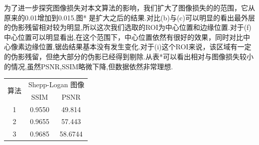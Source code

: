 \documentclass[hyperref]{ctexart}
\begin{document}
{		\begin{multicols}{2}
			为了进一步探究图像损失对本文算法的影响，我们扩大了图像损失的的范围，它从原来的0.01增加到0.015.图* 是扩大之后的结果.对比(b)与(c)可以明显的看出最外层的伪影残留相对较为明显,所以这次我们选取的ROI为中心位置和边缘位置.对于(f)中心位置可以明显看出,在这个范围下，中心位置依然有很好的效果，同时对比中心像素边缘位置,锯齿结果基本没有发生变化.对于(i)这个ROI来说，该区域有一定的伪影残留，但绝大部分的伪影已经得到剔除.从表*可以看出相对与图像损失较小的情况,虽然PSNR,SSIM略微下降,但数据依然非常理想.
		\begin{tabular}{ccc}
			\hline
			\multirow{2}{*}{算法} & \multicolumn{2}{c}{Shepp-Logan 图像}  \\
			& SSIM             & PSNR                 \\ \hline
			1                  & 0.9550                & 49.814                \\
			2                & 0.9655                & 57.443                \\
			3               & 0.9685                & 58.6744                   \\ \hline
		\end{tabular}
		\end{multicols}
		
		
		
		\begin{figure}[H]
			\centering
\end{figure}}
\end{document}
